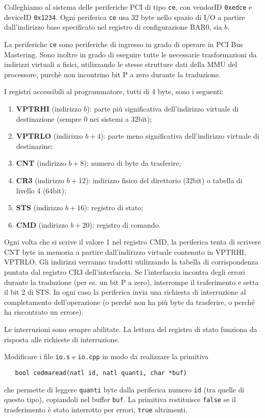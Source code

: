 Colleghiamo al sistema delle periferiche PCI di tipo \verb|ce|, con vendorID \verb|0xedce| e deviceID \verb|0x1234|.
Ogni periferica \verb|ce| usa 32 byte nello spazio di I/O a partire dall'indirizzo base specificato nel
registro di configurazione BAR0, sia $b$.

La periferiche \verb|ce| sono periferiche di ingresso in grado di operare in PCI Bus Mastering.
Sono inoltre in grado di eseguire tutte le necessarie trasformazioni da indirizzi virtuali a fisici,
utilizzando le stesse strutture dati della MMU del processore, purch\`e non incontrino bit P a
zero durante la traduzione.

I registri accessibili al programmatore, tutti di 4 byte, sono i seguenti:
\begin{enumerate}
  \item {\bf VPTRHI} (indirizzo $b$): parte pi\`u significativa dell'indirizzo virtuale di destinazione
  	(sempre 0 nei sistemi a 32bit);
  \item {\bf VPTRLO} (indirizzo $b+4$): parte meno significativa dell'indirizzo virtuale di destinazine;
  \item {\bf CNT}    (indirizzo $b+8$): numero di byte da trasferire;
  \item {\bf CR3}    (indirizzo $b+12$): indirizzo fisico del direttorio (32bit) o tabella di livello 4 (64bit);
  \item {\bf STS}    (indirizzo $b+16$): registro di stato;
  \item {\bf CMD}    (indirizzo $b+20$): registro di comando.
\end{enumerate}
Ogni volta che si scrive il valore 1 nel registro CMD, la periferica tenta di scrivere CNT byte in memoria
a partire dall'indirizzo virtuale contenuto in VPTRHI, VPTRLO. Gli indirizzi verranno tradotti utilizzando
la tabella di corrispondenza puntata dal registro CR3 dell'interfaccia. Se l'interfaccia incontra degli errori
durante la traduzione (per es. un bit P a zero), interrompe il traferimento e setta il bit 2 di STS.
In ogni caso la periferica invia una richiesta di interruzione al completamento dell'operazione
(o perch\'e non ha pi\`u byte da trasferire, o perch\'e ha riscontrato un errore).

Le interruzioni sono sempre abilitate. La lettura del registro di stato funziona da risposta alle richieste di interruzione.

Modificare i file \verb|io.s| e \verb|io.cpp| in modo da realizzare la primitiva
\begin{verbatim}
   bool cedmaread(natl id, natl quanti, char *buf)
\end{verbatim}
che permette di leggere \verb|quanti| byte dalla periferica numero \verb|id| (tra quelle di questo tipo), copiandoli
nel buffer \verb|buf|.  La primitiva restituisce
\verb|false| se il trasferimento \`e stato interrotto per errori, \verb|true| altrimenti.

